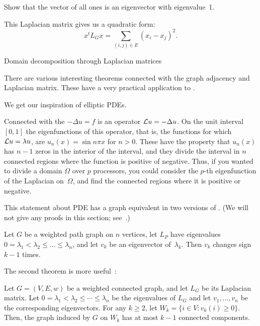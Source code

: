 \begin{exercise}
  Show that the vector of all ones is an eigenvector with eigenvalue~1.
\end{exercise}

This Laplacian matrix gives us a quadratic form:
\[ x^tL_Gx = \sum_{(i,j)\in E} (x_i-x_j)^2. \]

 {Domain decomposition through Laplacian matrices}
\label{sec:fiedler-vector}

There are various interesting theorems connected with the graph
adjacency and Laplacian matrix. 
These have a very practical application to
.

We get our inspiration of elliptic \acp{PDE}.

Connected with the 
$-\Delta u=f$ is an operator ${\cal L}u=-\Delta u$. 
On the unit interval $[0,1]$ the eigenfunctions
of this operator, that is, the functions for which ${\cal L}u=\lambda u$,
are $u_n(x)=\sin n\pi x$ for $n>0$. These have the property that $u_n(x)$
has $n-1$ zeros in the interior of the interval, and they divide the interval
in $n$ connected regions where the function is positive of negative.
Thus, if you wanted to divide a domain $\Omega$ over $p$ processors, you could
consider the $p$-th eigenfunction of the Laplacian on~$\Omega$, and find
the connected regions where it is positive or negative.

This statement about \ac{PDE} has a graph equivalent in two versions
of . (We will not give any proofs
in this section;
see~\cite{Spielman:spectral-graph-theory}.)
\begin{theorem}
  Let $G$ be a weighted path graph on $n$ vertices, let $L_P$ have
  eigenvalues $0 = \lambda_1 < \lambda_2\leq\ldots\leq\lambda_n$, and let
  $v_k$ be an eigenvector of~$\lambda_k$. Then $v_k$ changes sign
  $k-1$ times.
\end{theorem}

The second theorem is more useful~\cite{Fiedler:75-property}:
\begin{theorem}
  Let $G = (V,E,w)$ be a weighted connected graph, and let $L_G$ be
  its Laplacian matrix. Let $0 = \lambda_1 < \lambda_2 \leq \cdots
  \leq \lambda_n$ be the eigenvalues of $L_G$ and let $v_1,\ldots,v_n$
  be the corresponding eigenvectors. For any $k \geq 2$, let $W_k
  =\{i\in V\colon v_k(i)\geq0\}$. Then, the graph induced by $G$ on $W_k$
  has at most $k-1$ connected components.
\end{theorem}

